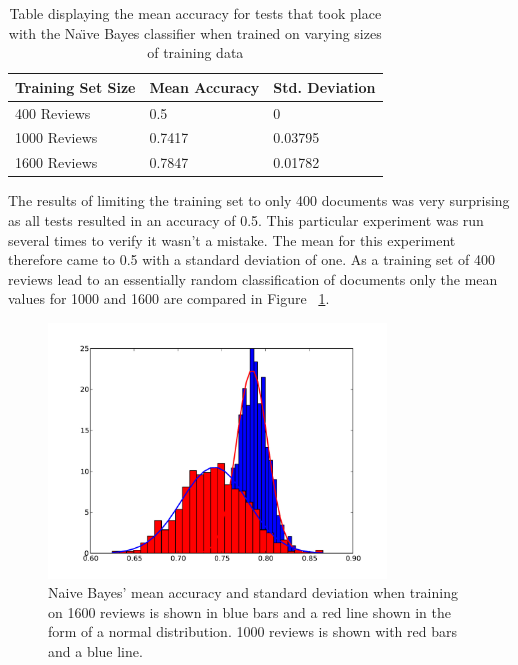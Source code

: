 \documentclass{llncs}
\begin{document}
\begin{table}
    \begin{center}
    \caption{Table displaying the mean accuracy for tests that took place with the Na\"\i ve Bayes classifier when trained on varying sizes of training data}
    \label{tab:varying_table}
    \begin{tabular}{| l | l | l |}
        \hline
        Training Set Size & Mean Accuracy & Std. Deviation \\ \hline
        400 Reviews & 0.5 & 0 \\ \hline
        1000 Reviews & 0.7417 & 0.03795 \\ \hline
        1600 Reviews & 0.7847 & 0.01782 \\ \hline
    \end{tabular}
    \end{center}
\end{table}

The results of limiting the training set to only 400 documents was very surprising as all tests resulted in an accuracy of 0.5. This particular experiment was run several times to verify it wasn't a mistake. The mean for this experiment therefore came to 0.5 with a standard deviation of one. As a training set of 400 reviews lead to an essentially random classification of documents only the mean values for 1000 and 1600 are compared in Figure ~\ref{fig:vary_comare}.

\begin{figure}
    \centering
    \includegraphics[width=0.8\textwidth]{vary_comparison.pdf}
    \caption{Naive Bayes' mean accuracy and standard deviation when training on 1600 reviews is shown in blue bars and a red line shown in the form of a normal distribution. 1000 reviews is shown with red bars and a blue line.}
    \label{fig:vary_comare}
\end{figure}
\end{document}
